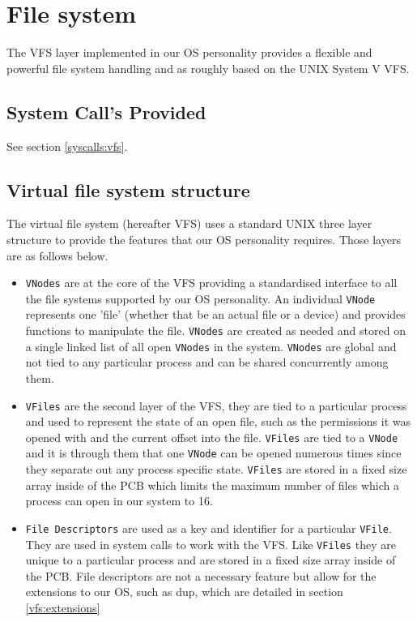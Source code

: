 \documentclass[12pt,english]{article}
\begin{document}
\section{File system} \label{vfs}

The VFS layer implemented in our OS personality provides a flexible and powerful file system handling and as roughly based on the UNIX System V VFS.

\subsection{System Call's Provided} \label{vfs:syscalls}

See section \ref{syscalls:vfs}.

\subsection{Virtual file system structure} \label{vfs:vfs_struct}

The virtual file system (hereafter VFS) uses a standard UNIX three layer structure to provide the features that our OS personality requires. Those layers are as follows below.

\begin{itemize}
\item \texttt{VNodes} are at the core of the VFS providing a standardised interface to all the file systems supported by our OS personality. An individual \texttt{VNode} represents one 'file' (whether that be an actual file or a device) and provides functions to manipulate the file. \texttt{VNodes} are created as needed and stored on a single linked list of all open \texttt{VNodes} in the system. \texttt{VNodes} are global and not tied to any particular process and can be shared concurrently among them.
\item \texttt{VFiles} are the second layer of the VFS, they are tied to a particular process and used to represent the state of an open file, such as the permissions it was opened with and the current offset into the file. \texttt{VFiles} are tied to a \texttt{VNode} and it is through them that one \texttt{VNode} can be opened numerous times since they separate out any process specific state. \texttt{VFiles} are stored in a fixed size array inside of the PCB which limits the maximum number of files which a process can open in our system to 16.
\item \texttt{File Descriptors} are used as a key and identifier for a particular \texttt{VFile}. They are used in system calls to work with the VFS. Like \texttt{VFiles} they are unique to a particular process and are stored in a fixed size array inside of the PCB. File descriptors are not a necessary feature but allow for the extensions to our OS, such as dup, which are detailed in section \ref{vfs:extensions}
\end{itemize}
\end{document}
